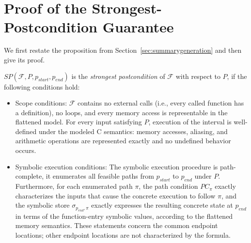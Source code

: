 \section{Proof of the Strongest-Postcondition Guarantee}
\label{app:sp-proof}

{We first restate the proposition from Section~\ref{sec:summarygeneration} and then give its proof.}

\begin{proposition}
\label{thm:sp-sound-complete}
 $\textit{SP}(\mathcal{F},P,p_{\textit{start}},p_{\textit{end}})$ is the \emph{strongest postcondition} of $\mathcal{F}$ with respect to $P$, if the following conditions hold:
 \begin{itemize}
     \item[(A1)] Scope conditions: $\mathcal{F}$ contains no external calls (i.e., every called function has a definition), no loops, and every memory access is representable in the flattened model. {For every input satisfying $P$, execution of the interval is well-defined under the modeled C semantics: memory accesses, aliasing, and arithmetic operations are represented exactly and no undefined behavior occurs.}
     \item[(A2)] Symbolic execution conditions: The symbolic execution procedure is path-complete, it enumerates all feasible paths from $p_{\textit{start}}$ to $p_{\textit{end}}$ {under $P$}. Furthermore, for each enumerated path $\pi$, the path condition $PC_\pi$ exactly characterizes the inputs that cause the concrete execution to follow $\pi$, and the symbolic store $\sigma_{p_{\textit{end}},\pi}$ exactly expresses the resulting concrete state at $p_{\textit{end}}$ in
     terms of the function-entry symbolic values, according to the flattened memory semantics. {These statements concern the common endpoint locations; other endpoint locations are not characterized by the formula.}

     
 \end{itemize}
\end{proposition}

